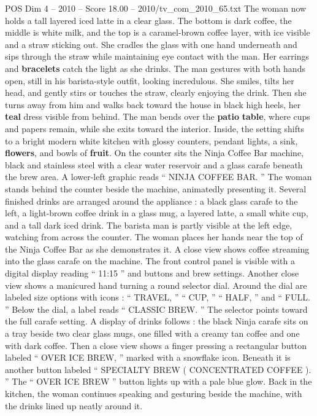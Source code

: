 \begin{textsample}{POS Dim 4 – 2010 – Score 18.00 – 2010/tv\_com\_2010\_65.txt}
The woman now holds a tall layered iced latte in a clear glass.
The bottom is dark coffee, the middle is white milk, and the top is a caramel-brown coffee layer, with ice visible and a straw sticking out.
She cradles the glass with one hand underneath and sips through the straw while maintaining eye contact with the man.
Her earrings and \textbf{bracelets} catch the light as she drinks.
The man gestures with both hands open, still in his barista-style outfit, looking incredulous.
She smiles, tilts her head, and gently stirs or touches the straw, clearly enjoying the drink.
Then she turns away from him and walks back toward the house in black high heels, her \textbf{teal} dress visible from behind.
The man bends over the \textbf{patio} \textbf{table}, where cups and papers remain, while she exits toward the interior.
Inside, the setting shifts to a bright modern white kitchen with glossy counters, pendant lights, a sink, \textbf{flowers}, and bowls of \textbf{fruit}.
On the counter sits the Ninja Coffee Bar machine, black and stainless steel with a clear water reservoir and a glass carafe beneath the brew area.
A lower-left graphic reads “ NINJA COFFEE BAR. ” The woman stands behind the counter beside the machine, animatedly presenting it.
Several finished drinks are arranged around the appliance : a black glass carafe to the left, a light-brown coffee drink in a glass mug, a layered latte, a small white cup, and a tall dark iced drink.
The barista man is partly visible at the left edge, watching from across the counter.
The woman places her hands near the top of the Ninja Coffee Bar as she demonstrates it.
A close view shows coffee streaming into the glass carafe on the machine.
The front control panel is visible with a digital display reading “ 11:15 ” and buttons and brew settings.
Another close view shows a manicured hand turning a round selector dial.
Around the dial are labeled size options with icons : “ TRAVEL, ” “ CUP, ” “ HALF, ” and “ FULL. ” Below the dial, a label reads “ CLASSIC BREW. ” The selector points toward the full carafe setting.
A display of drinks follows : the black Ninja carafe sits on a tray beside two clear glass mugs, one filled with a creamy tan coffee and one with dark coffee.
Then a close view shows a finger pressing a rectangular button labeled “ OVER ICE BREW, ” marked with a snowflake icon.
Beneath it is another button labeled “ SPECIALTY BREW ( CONCENTRATED COFFEE ). ” The “ OVER ICE BREW ” button lights up with a pale blue glow.
Back in the kitchen, the woman continues speaking and gesturing beside the machine, with the drinks lined up neatly around it.

\end{textsample}
